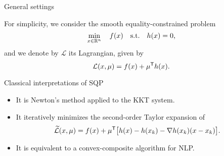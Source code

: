 \documentclass[
]{talk}
\newcommand*{\ceq}{h}
\newcommand*{\iter}[1][]{x\ifblank{#1}{}{_{#1}}}
\newcommand*{\lag}{\mathcal{L}}
\newcommand*{\lagalt}{\widetilde{\mathcal{L}}}
\newcommand*{\lmeq}[1][]{\mu\ifblank{#1}{}{_{#1}}}
\newcommand*{\obj}{f}
\begin{document}
\begin{frame}{General settings}

    For simplicity, we consider the \alert{smooth} equality-constrained problem
    \begin{equation*}
        \min_{\iter \in \R^n} \quad \obj(\iter) \quad \textrm{s.t.} \quad \ceq(\iter) = 0\text{,}
    \end{equation*}
    and we denote by $\lag$ its \alert{Lagrangian}, given by
    \begin{equation*}
        \lag(\iter, \lmeq) = \obj(\iter) + \lmeq^{\T} \ceq(\iter)\text{.}
    \end{equation*}

    \begin{block}{Classical interpretations of SQP}
        \begin{itemize}
            \item It is \alert{Newton}'s method applied to the KKT system.
            \item It iteratively minimizes the second-order Taylor expansion of
            \begin{equation*}
                \lagalt(\iter, \lmeq) = \obj(\iter) + \mu^{\T} \big[\ceq(\iter) - \ceq(\iter[k]) - \nabla \ceq(\iter[k]) (\iter - \iter[k])\big]\text{.}
            \end{equation*}
            \item It is equivalent to a convex-composite algorithm for NLP.
        \end{itemize}
    \end{block}
\end{frame}
\end{document}
